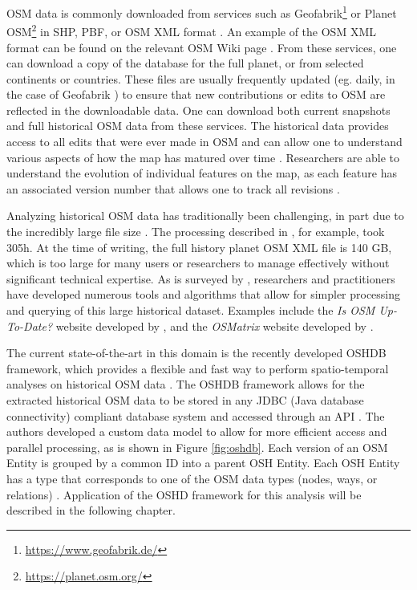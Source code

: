 OSM data is commonly downloaded from services such as Geofabrik\footnote{\url{https://www.geofabrik.de/}} or Planet OSM\footnote{\url{https://planet.osm.org/}} in SHP, PBF, or OSM XML format \parencite{mooney_accessing_2011}. An example of the OSM XML format can be found on the relevant OSM Wiki page \parencite{openstreetmap_wiki_osm_2017}. From these services, one can download a copy of the database for the full planet, or from selected continents or countries. These files are usually frequently updated (eg. daily, in the case of Geofabrik \parencite{geofabrik_openstreetmap_2020}) to ensure that new contributions or edits to OSM are reflected in the downloadable data. One can download both current snapshots and full historical OSM data from these services. The historical data provides access to all edits that were ever made in OSM and can allow one to understand various aspects of how the map has matured over time \parencite{corcoran_analysing_2013, mooney_characteristics_2012}. Researchers are able to understand the evolution of individual features on the map, as each feature has an associated version number that allows one to track all revisions \parencite{openstreetmap_wiki_elements_2020}. 

Analyzing historical OSM data has traditionally been challenging, in part due to the incredibly large file size \parencite{raifer_oshdb_2019, mooney_accessing_2011}. The processing described in \textcite{mooney_characteristics_2012}, for example, took 305h. At the time of writing, the full history planet OSM XML file is 140 GB, which is too large for many users or researchers to manage effectively without significant technical expertise. As is surveyed by \textcite{raifer_oshdb_2019}, researchers and practitioners have developed numerous tools and algorithms that allow for simpler processing and querying of this large historical dataset. Examples include the \textit{Is OSM Up-To-Date?} website developed by \textcite{minghini_open_2018}, and the \textit{OSMatrix} website developed by \textcite{roick_technical_2012}. 

The current state-of-the-art in this domain is the recently developed OSHDB framework, which provides a flexible and fast way to perform spatio-temporal analyses on historical OSM data \parencite{raifer_oshdb_2019}. The OSHDB framework allows for the extracted historical OSM data to be stored in any JDBC (Java database connectivity) compliant database system and accessed through an API \parencite{raifer_oshdb_2019}. The authors developed a custom data model to allow for more efficient access and parallel processing, as is shown in Figure \ref{fig:oshdb}. Each version of an OSM Entity is grouped by a common ID into a parent OSH Entity. Each OSH Entity has a type that corresponds to one of the OSM data types (nodes, ways, or relations) \parencite{raifer_oshdb_2019}. Application of the OSHD framework for this analysis will be described in the following chapter.

